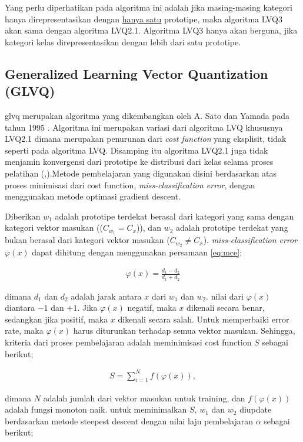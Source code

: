 Yang perlu diperhatikan pada algoritma ini adalah jika masing-masing kategori
hanya direpresentasikan dengan \underline{hanya satu} prototipe, maka algoritma
LVQ3 akan sama dengan algoritma LVQ2.1. Algoritma LVQ3 hanya akan berguna, jika
kategori kelas direpresentasikan dengan lebih dari satu prototipe. 


\subsection{Generalized Learning Vector Quantization (GLVQ)}
\label{ssec:glvq}

\Gls{glvq} merupakan algoritma yang dikembangkan oleh A. Sato dan Yamada pada
tahun 1995 \cite{Sato:1995}. Algoritma ini merupakan variasi dari algoritma LVQ
khususnya LVQ2.1 dimana merupakan penurunan dari \textit{cost function} yang
eksplisit, tidak seperti pada algoritma LVQ. Disamping itu algoritma LVQ2.1
juga tidak menjamin konvergensi dari prototipe ke distribusi dari kelas selama
proses pelatihan (\cite{Sato:1995},\cite{Sato:1998}).Metode pembelajaran yang 
digunakan disini berdasarkan atas proses minimisasi dari cost function,
\emph{miss-classification error}, dengan menggunakan metode optimasi gradient
descent.

Diberikan $w_1$ adalah prototipe terdekat berasal dari kategori
yang sama dengan kategori vektor masukan (($C_{w_1} = C_x$)), dan $w_2$ adalah
prototipe terdekat yang bukan berasal dari kategori vektor masukan ($C_{w_2} \neq
C_x$). \emph{miss-classification error} $\varphi(x)$ dapat dihitung dengan
menggunakan persamaan \ref{eq:mce};
 
\begin{align}
\label{eq:mce}
	\varphi(x) = \frac{d_1 - d_2}{d_1 + d_2}
\end{align}

\noindent dimana $d_1$ dan $d_2$ adalah jarak antara $x$ dari $w_1$ dan $w_2$.
nilai dari $\varphi(x)$ diantara $-1$ dan $+1$. Jika $\varphi(x)$ negatif, maka
$x$ dikenali secara benar, sedangkan jika positif, maka $x$ dikenali secara
salah. Untuk memperbaiki error rate, maka $\varphi(x)$ harus diturunkan terhadap
semua vektor masukan. Sehingga, kriteria dari proses pembelajaran adalah
meminimisasi cost function $S$ sebagai berikut;

\begin{align}
\label{eq:costS}
	S = \sum_{i=1}^{N} f(\varphi(x)), 
\end{align}

\noindent dimana $N$ adalah jumlah dari vektor masukan untuk training, dan
$f(\varphi(x))$ adalah fungsi monoton naik. untuk meminimalkan $S$, $w_1$ dan
$w_2$ diupdate berdasarkan metode steepest descent dengan nilai laju
pembelajaran $\alpha$ sebagai berikut;

